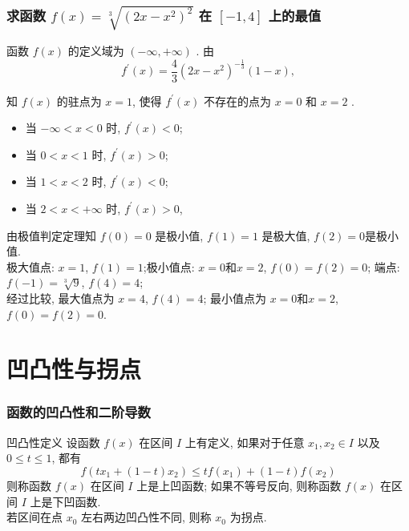 \documentclass[
10pt,
aspectratio=43,
]{beamer}
\begin{document}
\begin{frame}
	\frametitle{求函数 $f(x)=\sqrt[3]{\left(2 x-x^2\right)^2}$ 在 $[-1,4]$ 上的最值}
	函数 $f(x)$ 的定义域为 $(-\infty,+\infty)$ . 由
	$$
		f^{\prime}(x)=\frac{4}{3}\left(2 x-x^2\right)^{-\frac{1}{3}}(1-x),
	$$

	知 $f(x)$ 的驻点为 $x=1$, 使得 $f^{\prime}(x)$ 不存在的点为 $x=0$ 和 $x=2$ .
	\begin{itemize}
		\item 当 $-\infty<x<0$ 时, $f^{\prime}(x)<0$;
		\item 当 $0<x<1$ 时, $f^{\prime}(x)>0$;
		\item 当 $1<x<2$ 时, $f^{\prime}(x)<0$;
		\item 当 $2<x<+\infty$ 时, $f^{\prime}(x)>0$,
	\end{itemize}
	由极值判定定理知 $f(0)=0$ 是极小值, $f(1)=1$ 是极大值, $f(2)=0$是极小值.\\ \vspace{0.2cm}
	极大值点: $x=1$, $f(1)=1$;极小值点: $x=0$和$x=2$, $f(0)=f(2)=0$; 端点: $f(-1)=\sqrt[3]{9}$, $f(4)=4$;\\
	\vspace{0.4cm}
	经过比较, 最大值点为 $x=4$, $f(4)=4$; 最小值点为 $x=0$和$x=2$, $f(0)=f(2)=0$.
\end{frame}

\section{凹凸性与拐点}
\begin{frame}
	\frametitle{函数的凹凸性和二阶导数}

	\begin{block}{凹凸性定义}
		设函数 $f(x)$ 在区间 $I$ 上有定义, 如果对于任意 $x_1, x_2 \in I$ 以及 $0 \leq t \leq 1$, 都有
		\[ f(tx_1 + (1-t)x_2) \leq tf(x_1) + (1-t)f(x_2) \]
		则称函数 $f(x)$ 在区间 $I$ 上是上凹函数; 如果不等号反向, 则称函数 $f(x)$ 在区间 $I$ 上是下凹函数.\\
		若区间在点 $x_0$ 左右两边凹凸性不同, 则称 $x_0$ 为拐点.
	\end{block}
\end{frame}
\end{document}
